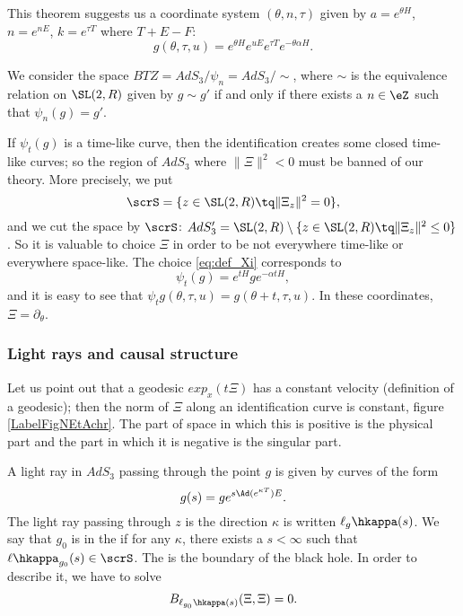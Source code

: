 This theorem suggests us a coordinate system $(\theta,n,\tau)$ given by $a=e^{\theta H}$, $n=e^{n E}$, $k=e^{\tau T}$ where $T+E-F$:
\[
g(\theta,\tau,u)=e^{\theta H}e^{uE}e^{\tau T}e^{-\theta\alpha H}.
\]

We consider the space $BTZ=AdS_3/\psi_n=AdS_3/\sim$, where $\sim$ is the equivalence relation on $\SL(2,R)$ given by $g\sim g'$ if and only if there exists a $n\in\eZ$ such that $\psi_n(g)=g'$.

If $\psi_t(g)$ is a time-like curve, then the identification creates some closed time-like curves; so the region of $AdS_3$ where $\|\Xi\|^2<0$ must be banned of our theory. More precisely, we put
\[
\scrS=\{z\in\SL(2,R)\tq \|\Xi_z\|^2=0\},
\]
and we cut the space by $\scrS$: $AdS_3'=\SL(2,R)\setminus \{z\in\SL(2,R)\tq \|\Xi_z\|^2\leq 0\}$. So it is valuable to choice $\Xi$ in order to be not everywhere time-like or everywhere space-like. The choice \eqref{eq:def_Xi} corresponds to 
\begin{equation}
\psi_t(g)=e^{tH}ge^{-\alpha tH},
\end{equation}
and it is easy to see that $\psi_tg(\theta,\tau,u)=g(\theta+t,\tau,u)$. In these coordinates, $\Xi=\partial_{\theta}$.

\subsubsection{Light rays and causal structure}

Let us point out that a geodesic $exp_x(t\Xi)$ has a constant velocity (definition of a geodesic); then the norm of $\Xi$ along an identification curve is constant, figure \ref{LabelFigNEtAchr}. The part of space in which this is positive is the physical part and the part in which it is negative is the singular part.


\newcommand{\CaptionFigNEtAchr}{The norm (in particular its sing) of \( \Xi\) is contant along a geodesic.}


A light ray in $AdS_3$ passing through the point $g$ is given by curves of the form
\begin{equation}
 g(s)=ge^{s\Ad(e^{\kappa T})E}.
\end{equation}
The light ray passing through $z$ is the direction $\kappa$ is written $\ell_g\hkappa(s)$. We say that $g_0$ is in the  if for any $\kappa$, there exists a $s<\infty$ such that $\ell\hkappa_{g_0}(s)\in\scrS$. The  is the boundary of the black hole. In order to describe it, we have to solve 
\begin{equation}
 B_{\ell_{g_0}\hkappa(s)}(\Xi,\Xi)=0.
\end{equation}
